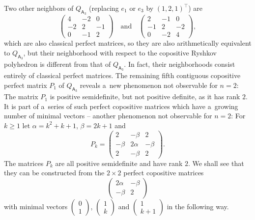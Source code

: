 \documentclass{commat}
\begin{document}
Two other neighbors of \(Q_{\mathsf{A}_3} \)
(replacing \(e_1 \) or \(e_3 \) by \({(1,2,1)}^\intercal \)) are
\[
    \begin{pmatrix}
4 & -2 & 0 \\ -2 & 2 & -1 \\ 0 & -1 & 2
\end{pmatrix}
    \quad\mbox{and}\quad
    \begin{pmatrix}
2 & -1 & 0 \\ -1 & 2 & -2 \\ 0 & -2 & 4
\end{pmatrix}
,
\]
which are also classical perfect matrices, so they are also arithmetically equivalent to
\(Q_{\mathsf{A}_3} \), but their neighborhood with respect to the copositive Ryshkov polyhedron
is different from that of \(Q_{\mathsf{A}_3} \).
In fact, their neighborhoods consist entirely of classical perfect matrices.
The remaining fifth contiguous copositive perfect matrix \(P_1 \) of \(Q_{\mathsf{A}_3} \)
reveals a~new phenomenon not observable for \(n=2 \): The matrix \(P_1 \) is positive semidefinite,
but not positive definite, as it has rank $2$.
It is part of a~series of such perfect copositive matrices which have a~growing number of
minimal vectors -- another phenomenon not observable for \(n=2 \):
For \(k \geq 1 \) let \(\alpha=k^2 +k+1 \), \(\beta=2k+1 \)
and
\[
	P_k =
\begin{pmatrix}
		2 & -\beta & 2 \\
		-\beta & 2\alpha & -\beta \\
		2 & -\beta & 2
\end{pmatrix}
.
\]
The matrices \(P_k \) are all positive semidefinite and have rank $2$.
We shall see that they can be constructed from the \(2 \times 2 \) perfect copositive matrices
\[
    \begin{pmatrix}
2\alpha & -\beta \\ -\beta & 2
\end{pmatrix}
\]
with minimal vectors
\(
\begin{pmatrix}
0 \\ 1
\end{pmatrix}
\),
\(
\begin{pmatrix}
1 \\ k
\end{pmatrix}
\) and
\(
\begin{pmatrix}
1 \\ k+1
\end{pmatrix}
\)
in the following way.
\end{document}
